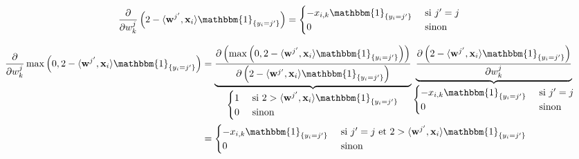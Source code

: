 \documentclass[11pt, french, english]{article}
\def\wkj{w_{k}^{j}}
\begin{document}
\begin{enumerate}
\begin{reponse}
		      \begin{equation}
			      \label{eq:2-deriv_prod_scal_1}
			      \frac{\partial}{\partial\wkj}\left(2 - \langle \mathbf{w}^{j^{\prime}}, \mathbf{x}_i \rangle\mathbbm{1}_{\{y_i = j^{\prime}\}}\right)
			      = \begin{cases}
				      - x_{i,k}\mathbbm{1}_{\{y_i = j^{\prime}\}} & \text{ si } j^{\prime} = j \\
				      0                                           & \text{ sinon }
			      \end{cases}
		      \end{equation}

		      \begin{align}
			      \label{eq:deriv_max}
			      \begin{split}
				      \frac{\partial}{\partial\wkj}\max\left(0, 2 - \langle \mathbf{w}^{j^{\prime}}, \mathbf{x}_i \rangle\mathbbm{1}_{\{y_i = j^{\prime}\}}\right)
				      &= \underbrace{\frac{\partial\left(\max\left(0, 2 - \langle \mathbf{w}^{j^{\prime}}, \mathbf{x}_i \rangle\mathbbm{1}_{\{y_i = j^{\prime}\}}\right)\right)}{\partial\left(2 - \langle \mathbf{w}^{j^{\prime}}, \mathbf{x}_i \rangle\mathbbm{1}_{\{y_i = j^{\prime}\}}\right)}}_{\begin{cases}
						      1 & \text{ si } 2 >\langle \mathbf{w}^{j^{\prime}}, \mathbf{x}_i \rangle\mathbbm{1}_{\{y_i = j^{\prime}\}} \\
						      0 & \text{ sinon }
					      \end{cases}}\underbrace{\frac{\partial\left(2 - \langle \mathbf{w}^{j^{\prime}}, \mathbf{x}_i \rangle\mathbbm{1}_{\{y_i = j^{\prime}\}}\right)}{\partial\wkj}}_{\begin{cases}
						      - x_{i,k}\mathbbm{1}_{\{y_i = j^{\prime}\}} & \text{ si } j^{\prime} = j \\
						      0                                           & \text{ sinon }
					      \end{cases}}\\
				      &= \begin{cases}
					      - x_{i,k}\mathbbm{1}_{\{y_i = j^{\prime}\}} & \text{ si } j^{\prime} = j \text{ et } 2 >\langle \mathbf{w}^{j^{\prime}}, \mathbf{x}_i \rangle\mathbbm{1}_{\{y_i = j^{\prime}\}} \\
					      0                                           & \text{ sinon }
				      \end{cases}
			      \end{split}
		      \end{align}


\end{reponse}
\end{enumerate}
\end{document}
